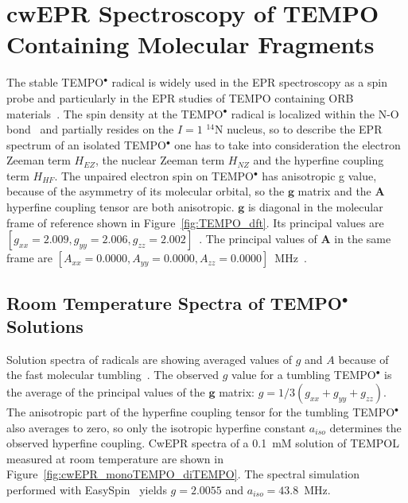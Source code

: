 \section{cwEPR Spectroscopy of TEMPO Containing Molecular Fragments}
The stable TEMPO$^\bullet$ radical is widely used in the EPR spectroscopy as a spin probe and particularly in the EPR studies of TEMPO containing ORB materials~\cite{nakahara2002_cpl, nishide2004_electact, bahaceci2013_jpowersources, aydin2015_jsoistatelect, khodeir2019_softmatter, Zhang2018}. The spin density at the TEMPO$^\bullet$ radical is localized within the N-O bond~\cite{Owenius2001} and partially resides on the $I=1$ $^{14}$N nucleus, so to describe the EPR spectrum of an isolated TEMPO$^\bullet$ one has to take into consideration the electron Zeeman term $H_{EZ}$, the nuclear Zeeman term $H_{NZ}$ and the hyperfine coupling term $H_{HF}$. The unpaired electron spin on TEMPO$^\bullet$ has anisotropic g value, because of the asymmetry of its molecular orbital, so the $\textbf{g}$ matrix and the $\textbf{A}$ hyperfine coupling tensor are both anisotropic. $\textbf{g}$ is diagonal in the molecular frame of reference shown in Figure~\ref{fig:TEMPO_dft}. Its principal values are $\left[g_{xx}=2.009,g_{yy}=2.006,g_{zz}=2.002\right]$~\cite{Liu_2008,Bordignon2017}. The principal values of $\textbf{A}$ in the same frame are $\left[A_{xx}=0.0000,A_{yy}=0.0000,A_{zz}=0.0000\right]$~MHz~\cite{Liu_2008,Bordignon2017}.

\subsection{Room Temperature Spectra of TEMPO$^{\bullet}$ Solutions}
Solution spectra of radicals are showing averaged values of $g$ and $A$ because of the fast molecular tumbling~\cite{Liu_2008,Carrington_solution_epr}. The observed $g$ value for a tumbling TEMPO$^{\bullet}$ is the average of the principal values of the $\textbf{g}$ matrix: $g = 1/3\left(g_{xx}+g_{yy}+g_{zz}\right)$. The anisotropic part of the hyperfine coupling tensor for the tumbling TEMPO$^{\bullet}$ also averages to zero, so only the isotropic hyperfine constant $a_{iso}$ determines the observed hyperfine coupling. CwEPR spectra of a 0.1~mM solution of TEMPOL measured at room temperature are shown in Figure~\ref{fig:cwEPR_monoTEMPO_diTEMPO}. The spectral simulation performed with EasySpin~\cite{Easyspin} yields $g=2.0055$ and $a_{iso}=43.8$~MHz.

